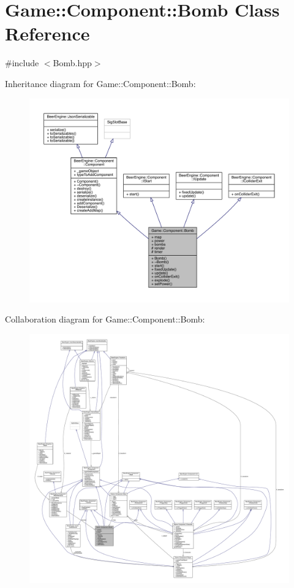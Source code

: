 \hypertarget{class_game_1_1_component_1_1_bomb}{}\section{Game\+:\+:Component\+:\+:Bomb Class Reference}
\label{class_game_1_1_component_1_1_bomb}


{\ttfamily \#include $<$Bomb.\+hpp$>$}



Inheritance diagram for Game\+:\+:Component\+:\+:Bomb\+:\nopagebreak
\begin{figure}[H]
\begin{center}
\leavevmode
\includegraphics[width=350pt]{class_game_1_1_component_1_1_bomb__inherit__graph}
\end{center}
\end{figure}


Collaboration diagram for Game\+:\+:Component\+:\+:Bomb\+:
\nopagebreak
\begin{figure}[H]
\begin{center}
\leavevmode
\includegraphics[width=350pt]{class_game_1_1_component_1_1_bomb__coll__graph}
\end{center}
\end{figure}
